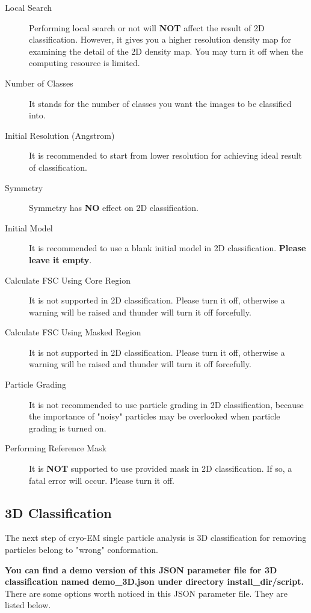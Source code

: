 \documentclass{article}
\begin{document}
        \begin{description}
            \item[Local Search] Performing local search or not will \textbf{NOT} affect the result of 2D classification. However, it gives you a higher resolution density map for examining the detail of the 2D density map. You may turn it off when the computing resource is limited.
            \item[Number of Classes] It stands for the number of classes you want the images to be classified into.
            \item[Initial Resolution (Angstrom)] It is recommended to start from lower resolution for achieving ideal result of classification.
            \item[Symmetry] Symmetry has \textbf{NO} effect on 2D classification.
            \item[Initial Model] It is recommended to use a blank initial model in 2D classification. \textbf{Please leave it empty}.
            \item[Calculate FSC Using Core Region] It is not supported in 2D classification. Please turn it off, otherwise a warning will be raised and \textsf{thunder} will turn it off forcefully.
            \item[Calculate FSC Using Masked Region] It is not supported in 2D classification. Please turn it off, otherwise a warning will be raised and \textsf{thunder} will turn it off forcefully.
            \item[Particle Grading] It is not recommended to use particle grading in 2D classification, because the importance of "noisy" particles may be overlooked when particle grading is turned on.
            \item[Performing Reference Mask] It is \textbf{NOT} supported to use provided mask in 2D classification. If so, a fatal error will occur. Please turn it off.
        \end{description}
        
        \subsection{3D Classification}
           
        The next step of cryo-EM single particle analysis is 3D classification for removing particles belong to "wrong" conformation.
                
        \textbf{You can find a demo version of this JSON parameter file for 3D classification named \textsf{demo\_3D.json} under directory \textsf{install\_dir/script}.} There are some options worth noticed in this JSON parameter file. They are listed below.
        
\end{document}
